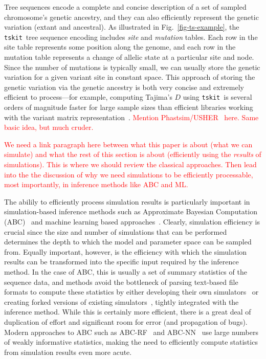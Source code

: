 \documentclass{article}
\newcommand{\tskit}[0]{\texttt{tskit}}
\newcommand{\jkcomment}[1]{\textcolor{red}{#1}}
\begin{document}
Tree sequences encode a complete and concise description of a set of sampled
chromosome's genetic ancestry, and they can also efficiently represent
the genetic variation (extant and ancestral).
As illustrated in Fig.~\ref{fig-ts-example}, the \tskit\ tree
sequence encoding includes \emph{site} and \emph{mutation} tables. Each
row in the site table represents some position along the genome, and
each row in the mutation table represents a change of allelic state
at a particular site and node. Since the number of mutations is typically
small, we can usually store the genetic variation for a given variant
site in constant space. This approach of storing the genetic variation
via the genetic ancestry is both very concise and extremely efficient
to process---for example, computing Tajima's $D$ using \tskit\
is several orders of magnitude faster for large sample sizes than
efficient libraries working with the variant matrix
representation~\citep{ralph2020efficiently}.
\jkcomment{Mention Phastsim/USHER~\citep{demaio2021phastsim,turakhia2021ultrafast}
here. Same basic idea, but much cruder.}

\jkcomment{We need a link paragraph here between what this paper is
about (what we can simulate) and what the rest of this section is about
(efficiently using the \emph{results} of simulations). This is where
we should review the classical approaches. Then lead into the
the discussion of why we need simulations to be efficiently processable,
most importantly, in inference methods like ABC and ML.}

The abilily to efficiently process simulation results is
particularly important in simulation-based inference methods
such as Approximate Bayesian Computation
(ABC)~\citep{beaumont2002approximate,csillery2010approximate,wegmann2010abctoolbox}
and machine learning based
approaches~\citep{sheehan2016deep,schrider2018supervised,flagel2019unreasonable,
sanchez2020deep}. Clearly, simulation efficiency is
crucial since the size and number of simulations that can be performed determines
the depth to which the model and parameter space can be sampled from.
Equally important,
however, is the efficiency with which the simulation results can be
transformed into the specific input required by the inference method.
In the case of ABC, this is usually a set of summary statistics of the sequence
data, and methods avoid the bottleneck of parsing
text-based file formats to compute these statistics
by either developing their own
simulators~\citep[e.g.][]{cornuet2008inferring,lopes2009popabc}
or creating forked versions of existing
simulators~\cite[e.g.][]{pavlidis2010msabc,quinto2018modeling},
tightly integrated with the inference method.
While this is certainly more efficient,
there is a great deal of duplication of effort and significant
room for error (and propagation of bugs).
Modern approaches to ABC such as
ABC-RF~\citep{raynal2019abc,pudlo2016abc} and
ABC-NN~\citep{csillery2012abc,blum2010abc} use large
numbers of weakly informative statistics,
making the need to efficiently compute statistics from simulation
results even more acute.
\end{document}
